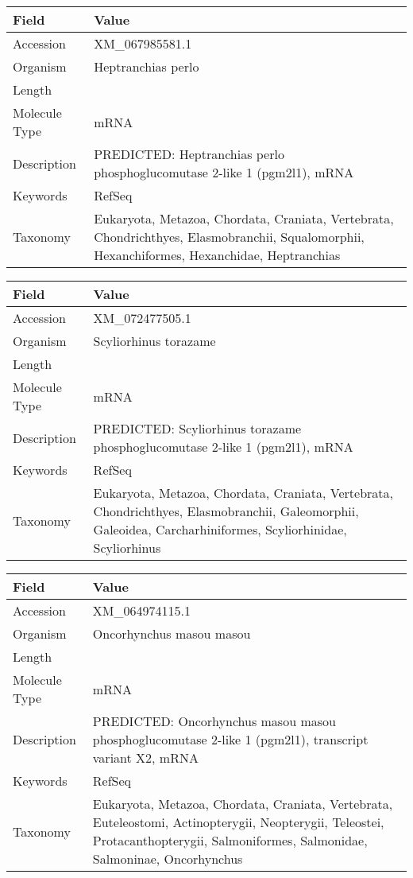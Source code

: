 \documentclass[10pt]{article}
\begin{document}
{\footnotesize
\begin{longtable}{>{\raggedright\arraybackslash}p{4.5cm} >{\raggedright\arraybackslash}p{11.5cm}}
\textbf{Field} & \textbf{Value} \\
\hline
Accession & XM\_067985581.1 \\
Organism & Heptranchias perlo \\
Length & 6587 \\
Molecule Type & mRNA \\
Description & PREDICTED: Heptranchias perlo phosphoglucomutase 2-like 1 (pgm2l1), mRNA \\
Keywords & RefSeq \\
Taxonomy & Eukaryota, Metazoa, Chordata, Craniata, Vertebrata, Chondrichthyes, Elasmobranchii, Squalomorphii, Hexanchiformes, Hexanchidae, Heptranchias \\
\end{longtable}
}

{\footnotesize
\begin{longtable}{>{\raggedright\arraybackslash}p{4.5cm} >{\raggedright\arraybackslash}p{11.5cm}}
\textbf{Field} & \textbf{Value} \\
\hline
Accession & XM\_072477505.1 \\
Organism & Scyliorhinus torazame \\
Length & 6750 \\
Molecule Type & mRNA \\
Description & PREDICTED: Scyliorhinus torazame phosphoglucomutase 2-like 1 (pgm2l1), mRNA \\
Keywords & RefSeq \\
Taxonomy & Eukaryota, Metazoa, Chordata, Craniata, Vertebrata, Chondrichthyes, Elasmobranchii, Galeomorphii, Galeoidea, Carcharhiniformes, Scyliorhinidae, Scyliorhinus \\
\end{longtable}
}

{\footnotesize
\begin{longtable}{>{\raggedright\arraybackslash}p{4.5cm} >{\raggedright\arraybackslash}p{11.5cm}}
\textbf{Field} & \textbf{Value} \\
\hline
Accession & XM\_064974115.1 \\
Organism & Oncorhynchus masou masou \\
Length & 4114 \\
Molecule Type & mRNA \\
Description & PREDICTED: Oncorhynchus masou masou phosphoglucomutase 2-like 1 (pgm2l1), transcript variant X2, mRNA \\
Keywords & RefSeq \\
Taxonomy & Eukaryota, Metazoa, Chordata, Craniata, Vertebrata, Euteleostomi, Actinopterygii, Neopterygii, Teleostei, Protacanthopterygii, Salmoniformes, Salmonidae, Salmoninae, Oncorhynchus \\
\end{longtable}
}
\end{document}
